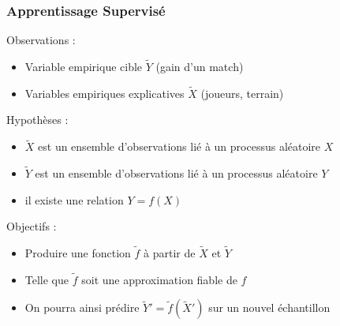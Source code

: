 \documentclass[11pt]{beamer}
\newenvironment{slide}[1]{%
\begin{frame}[environment=slide]
\frametitle{#1}
}{%
\end{frame}
}
\begin{document}
\begin{slide}{Apprentissage Supervisé}

Observations :\\

\begin{itemize}

\item Variable empirique cible $\tilde{Y}$ (gain d'un match)
\item Variables empiriques explicatives $\tilde{X}$ (joueurs, terrain)

\end{itemize}

\pause

Hypothèses :\\

\begin{itemize}

\item $\tilde{X}$ est un ensemble d'observations lié à un processus aléatoire $X$
\item $\tilde{Y}$ est un ensemble d'observations lié à un processus aléatoire $Y$
\item il existe une relation $Y = f(X)$

\end{itemize}

\pause

Objectifs :\\

\begin{itemize}
\item Produire une fonction $\tilde{f}$ à partir de $\tilde{X}$ et $\tilde{Y}$
\item Telle que $\tilde{f}$ soit une approximation fiable de $f$
\item On pourra ainsi prédire $\tilde{Y}' = \tilde{f}(\tilde{X}')$ sur un nouvel échantillon 
\end{itemize}

\end{slide}
\end{document}
